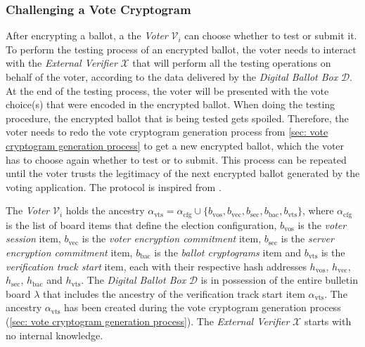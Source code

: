 

\clearpage
\subsubsection{Challenging a Vote Cryptogram} \label{sec: challenging a vote cryptogram}
After encrypting a ballot, a the \textit{Voter} $\mathcal{V}_i$ can choose whether to test or submit it. To perform the testing process of an encrypted ballot, the voter needs to interact with the \textit{External Verifier} $\mathcal{X}$ that will perform all the testing operations on behalf of the voter, according to the data delivered by the \textit{Digital Ballot Box} $\mathcal{D}$. At the end of the testing process, the voter will be presented with the vote choice(s) that were encoded in the encrypted ballot. When doing the testing procedure, the encrypted ballot that is being tested gets spoiled. Therefore, the voter needs to redo the vote cryptogram generation process from \cref{sec: vote cryptogram generation process} to get a new encrypted ballot, which the voter has to choose again whether to test or to submit. This process can be repeated until the voter trusts the legitimacy of the next encrypted ballot generated by the voting application. The protocol is inspired from \cite{Benaloh06}.

The \textit{Voter} $\mathcal{V}_i$ holds the ancestry $\alpha_\mathrm{vts} = \alpha_\mathrm{cfg} \cup \{ b_\mathrm{vos}, b_\mathrm{vec}, b_\mathrm{sec}, b_\mathrm{bac}, b_\mathrm{vts} \}$, where $\alpha_\mathrm{cfg}$ is the list of board items that define the election configuration, $b_\mathrm{vos}$ is the \textit{voter session} item, $b_\mathrm{vec}$ is the \textit{voter encryption commitment} item, $b_\mathrm{sec}$ is the \textit{server encryption commitment} item, $b_\mathrm{bac}$ is the \textit{ballot cryptograms} item and $b_\mathrm{vts}$ is the \textit{verification track start} item, each with their respective hash addresses $h_\mathrm{vos}$, $h_\mathrm{vec}$, $h_\mathrm{sec}$, $h_\mathrm{bac}$ and $h_\mathrm{vts}$. The \textit{Digital Ballot Box} $\mathcal{D}$ is in possession of the entire bulletin board $\lambda$ that includes the ancestry of the verification track start item $\alpha_\mathrm{vts}$. The ancestry $\alpha_\mathrm{vts}$ has been created during the vote cryptogram generation process (\cref{sec: vote cryptogram generation process}). The \textit{External Verifier} $\mathcal{X}$ starts with no internal knowledge.

